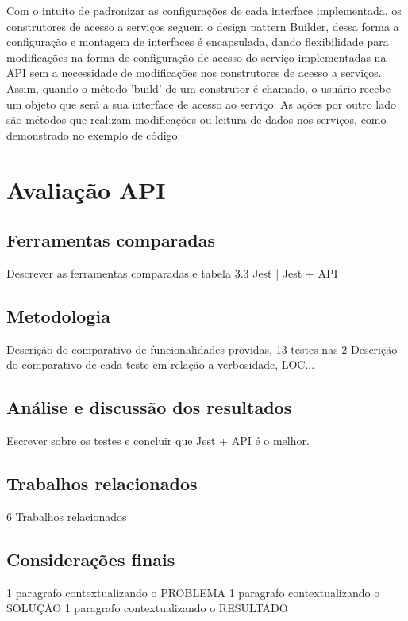 \documentclass[10pt,brazil,english]{article}
\begin{document}
Com o intuito de padronizar as configurações de cada interface implementada, os construtores de acesso a serviços seguem o design pattern Builder, dessa forma a configuração e montagem de interfaces é encapsulada, dando flexibilidade para modificações na forma de configuração de acesso do serviço implementadas na API sem a necessidade de modificações nos construtores de acesso a serviços. Assim, quando o método 'build' de um construtor é chamado, o usuário recebe um objeto que será a sua interface de acesso ao serviço. As ações por outro lado são métodos que realizam modificações ou leitura de dados nos serviços, como demonstrado no exemplo de código:



\section{Avaliação API}
\subsection{Ferramentas comparadas}
Descrever as ferramentas comparadas e tabela 3.3 Jest | Jest + API

\subsection{Metodologia}
Descrição do comparativo de funcionalidades providas, 13 testes nas 2
Descrição do comparativo de cada teste em relação a verbosidade, LOC...

\subsection{Análise e  discussão dos resultados}
Escrever sobre os testes e concluir que Jest + API é o melhor.

\subsection{Trabalhos relacionados}
6 Trabalhos relacionados

\subsection{Considerações finais}
1 paragrafo contextualizando o PROBLEMA
1 paragrafo contextualizando o SOLUÇÃO
1 paragrafo contextualizando o RESULTADO



\end{document}
